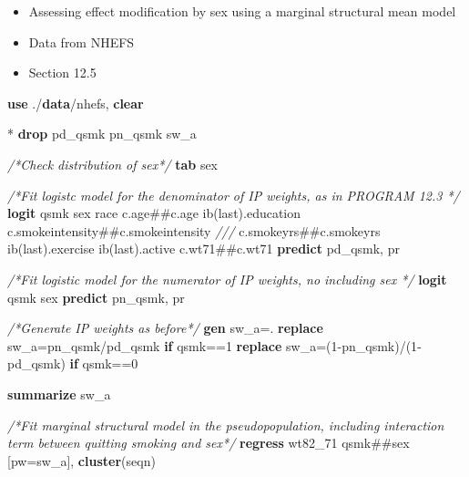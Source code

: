 \documentclass[
  10pt,
]{book}
\newenvironment{Shaded}{\begin{snugshade}}{\end{snugshade}}
\newcommand{\CommentTok}[1]{\textcolor[rgb]{0.56,0.35,0.01}{\textit{#1}}}
\newcommand{\FunctionTok}[1]{\textcolor[rgb]{0.00,0.00,0.00}{#1}}
\newcommand{\KeywordTok}[1]{\textcolor[rgb]{0.13,0.29,0.53}{\textbf{#1}}}
\newcommand{\NormalTok}[1]{#1}
\providecommand{\tightlist}{%
  \setlength{\itemsep}{0pt}\setlength{\parskip}{0pt}}
\begin{document}
\begin{itemize}
\tightlist
\item
  Assessing effect modification by sex using a marginal structural mean model
\item
  Data from NHEFS
\item
  Section 12.5
\end{itemize}

\begin{Shaded}
\begin{Highlighting}[]
\KeywordTok{use}\NormalTok{ ./}\KeywordTok{data}\NormalTok{/nhefs, }\KeywordTok{clear}

\NormalTok{* }\KeywordTok{drop}\NormalTok{ pd\_qsmk pn\_qsmk sw\_a}

\CommentTok{/*Check distribution of sex*/}
\KeywordTok{tab}\NormalTok{ sex}

\CommentTok{/*Fit logistc model for the denominator of IP weights, as in PROGRAM 12.3 */}
\KeywordTok{logit}\NormalTok{ qsmk sex race c.age\#\#c.age ib(}\FunctionTok{last}\NormalTok{).education c.smokeintensity\#\#c.smokeintensity }\CommentTok{///}
\NormalTok{c.smokeyrs\#\#c.smokeyrs ib(}\FunctionTok{last}\NormalTok{).exercise ib(}\FunctionTok{last}\NormalTok{).active c.wt71\#\#c.wt71 }
\KeywordTok{predict}\NormalTok{ pd\_qsmk, pr}

\CommentTok{/*Fit logistic model for the numerator of IP weights, no including sex */}
\KeywordTok{logit}\NormalTok{ qsmk sex}
\KeywordTok{predict}\NormalTok{ pn\_qsmk, pr}

\CommentTok{/*Generate IP weights as before*/}
\KeywordTok{gen}\NormalTok{ sw\_a=.}
\KeywordTok{replace}\NormalTok{ sw\_a=pn\_qsmk/pd\_qsmk }\KeywordTok{if}\NormalTok{ qsmk==1}
\KeywordTok{replace}\NormalTok{ sw\_a=(1{-}pn\_qsmk)/(1{-}pd\_qsmk) }\KeywordTok{if}\NormalTok{ qsmk==0}

\KeywordTok{summarize}\NormalTok{ sw\_a}

\CommentTok{/*Fit marginal structural model in the pseudopopulation, including interaction term between quitting smoking and sex*/}
\KeywordTok{regress}\NormalTok{ wt82\_71 qsmk\#\#sex [pw=sw\_a], }\KeywordTok{cluster}\NormalTok{(seqn)}
\end{Highlighting}
\end{Shaded}
\end{document}
